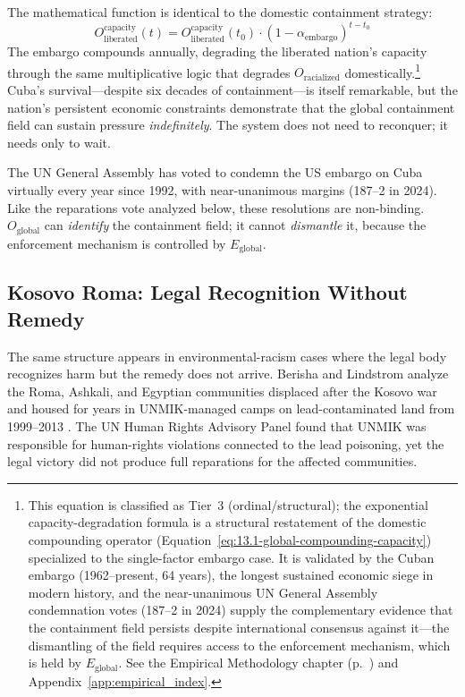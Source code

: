 The mathematical function is identical to the domestic containment strategy:
\begin{equation}\label{eq:13.12-global-containment-strategy}
O_{\text{liberated}}^{\text{capacity}}(t) = O_{\text{liberated}}^{\text{capacity}}(t_0) \cdot (1 - \alpha_{\text{embargo}})^{t - t_0}
\end{equation}
The embargo compounds annually, degrading the liberated nation's capacity through the same multiplicative logic that degrades $O_{\text{racialized}}$ domestically.\footnote{This equation is classified as Tier~3 (ordinal/structural); the exponential capacity-degradation formula is a structural restatement of the domestic compounding operator (Equation~\ref{eq:13.1-global-compounding-capacity}) specialized to the single-factor embargo case. It is validated by the Cuban embargo (1962--present, 64 years), the longest sustained economic siege in modern history, and the near-unanimous UN General Assembly condemnation votes (187--2 in 2024) supply the complementary evidence that the containment field persists despite international consensus against it---the dismantling of the field requires access to the enforcement mechanism, which is held by $E_{\text{global}}$. See the Empirical Methodology chapter (p.~\pageref{ch:empirical_methodology}) and Appendix~\ref{app:empirical_index}.} Cuba's survival---despite six decades of containment---is itself remarkable, but the nation's persistent economic constraints demonstrate that the global containment field can sustain pressure \textit{indefinitely}. The system does not need to reconquer; it needs only to wait.

The UN General Assembly has voted to condemn the US embargo on Cuba virtually every year since 1992, with near-unanimous margins (187--2 in 2024). Like the reparations vote analyzed below, these resolutions are non-binding. $O_{\text{global}}$ can \textit{identify} the containment field; it cannot \textit{dismantle} it, because the enforcement mechanism is controlled by $E_{\text{global}}$.

\subsection{Kosovo Roma: Legal Recognition Without Remedy}

The same structure appears in environmental-racism cases where the legal body recognizes harm but the remedy does not arrive. Berisha and Lindstrom analyze the Roma, Ashkali, and Egyptian communities displaced after the Kosovo war and housed for years in UNMIK-managed camps on lead-contaminated land from 1999--2013 \cite{berisha_lindstrom_kosovo_roma_2024}. The UN Human Rights Advisory Panel found that UNMIK was responsible for human-rights violations connected to the lead poisoning, yet the legal victory did not produce full reparations for the affected communities.

